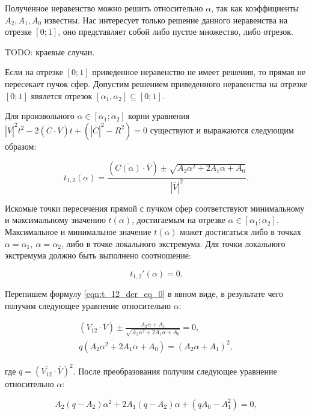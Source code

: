 \documentclass[a4paper,10pt]{extarticle}                     %
\numberwithin{equation}{section}                             %
\numberwithin{figure}{section}                               %
\theoremstyle{plain}                                         %
\begin{document}
Полученное неравенство можно решить относительно $\alpha$, так как коэффициенты $A_2, A_1, A_0$ известны.
Нас интересует только решение данного неравенства на отрезке $[0; 1]$, оно представляет собой либо пустое множество, либо отрезок.

TODO: краевые случаи.

Если на отрезке $[0; 1]$ приведенное неравенство не имеет решения, то прямая не пересекает пучок сфер.
Допустим решением приведенного неравенства на отрезке $[0; 1]$ явялется отрезок $[\alpha_1, \alpha_2] \subseteq [0; 1]$.

Для произвольного $\alpha \in [\alpha_1; \alpha_2]$ корни уравнения ${|\overline{V}|}^2t^2 - 2(\overline{C}\cdot\overline{V})t + ({|\overline{C}|}^2 - R^2) = 0$ существуют и выражаются следующим образом:

\begin{equation}
    t_{1,2}(\alpha) = \frac{(\overline{C(\alpha)}\cdot\overline{V}) \pm \sqrt{A_2\alpha^2 + 2A_1\alpha + A_0}}{|\overline{V}|^2}.
\end{equation}

Искомые точки пересечения прямой с пучком сфер соответствуют минимальному и максимальному значению $t(\alpha)$, достигаемым на отрезке $\alpha \in [\alpha_1; \alpha_2]$.
Максимальное и минимальное значение $t(\alpha)$ может достигаться либо в точках $\alpha = \alpha_1, \ \alpha = \alpha_2$, либо в точке локального экстремума.
Для точки локального экстремума должно быть выполнено соотношение:

\begin{equation}\label{eqn:t_12_der_eq_0}
    t_{1,2}'(\alpha) = 0.
\end{equation}

Перепишем формулу \ref{eqn:t_12_der_eq_0} в явном виде, в результате чего получим следующее уравнение относительно $\alpha$:

\begin{eqnarray}
    (\overline{V_{12}}\cdot\overline{V}) \pm \frac{A_2\alpha + A_1}{\sqrt{A_2\alpha^2 + 2A_1\alpha + A_0}} = 0, \\
    q(A_2\alpha^2 + 2A_1\alpha + A_0) = (A_2\alpha + A_1)^2,
\end{eqnarray}

где $q = (\overline{V_{12}}\cdot\overline{V})^2$.
После преобразования получим следующее уравнение относительно $\alpha$:

\begin{equation}\label{eqn:alpha_eqn}
    A_2(q - A_2)\alpha^2 + 2A_1(q - A_2)\alpha + (qA_0 - A_1^2) = 0,
\end{equation}
\end{document}
